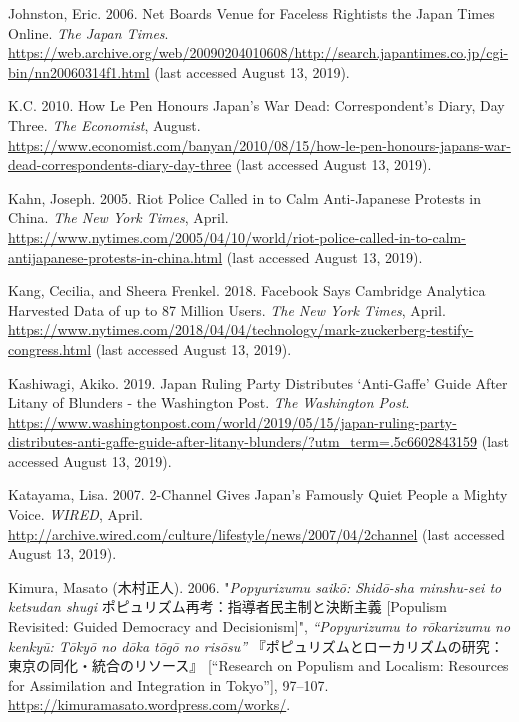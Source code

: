\documentclass[10pt,british,A4paper,oneside]{memoir}
\begin{document}
\hypertarget{ref-johnston_net_2006}{}
Johnston, Eric. 2006. Net Boards Venue for Faceless Rightists the Japan
Times Online. \emph{The Japan Times}.
\url{https://web.archive.org/web/20090204010608/http://search.japantimes.co.jp/cgi-bin/nn20060314f1.html} (last accessed August 13, 2019).

\hypertarget{ref-k.c._how_2010}{}
K.C. 2010. How Le Pen Honours Japan's War Dead: Correspondent's Diary,
Day Three. \emph{The Economist}, August.
\url{https://www.economist.com/banyan/2010/08/15/how-le-pen-honours-japans-war-dead-correspondents-diary-day-three} (last accessed August 13, 2019).

\hypertarget{ref-kahn_riot_2005}{}
Kahn, Joseph. 2005. Riot Police Called in to Calm Anti-Japanese Protests
in China. \emph{The New York Times}, April.
\url{https://www.nytimes.com/2005/04/10/world/riot-police-called-in-to-calm-antijapanese-protests-in-china.html} (last accessed August 13, 2019).

\hypertarget{ref-kang_facebook_2018}{}
Kang, Cecilia, and Sheera Frenkel. 2018. Facebook Says Cambridge
Analytica Harvested Data of up to 87 Million Users. \emph{The New York
Times}, April.
\url{https://www.nytimes.com/2018/04/04/technology/mark-zuckerberg-testify-congress.html} (last accessed August 13, 2019).

\hypertarget{ref-kashiwagi_japan_2019}{}
Kashiwagi, Akiko. 2019. Japan Ruling Party Distributes `Anti-Gaffe'
Guide After Litany of Blunders - the Washington Post. \emph{The
Washington Post}.
\url{https://www.washingtonpost.com/world/2019/05/15/japan-ruling-party-distributes-anti-gaffe-guide-after-litany-blunders/?utm_term=.5c6602843159} (last accessed August 13, 2019).

\hypertarget{ref-katayama_2-channel_2007}{}
Katayama, Lisa. 2007. 2-Channel Gives Japan's Famously Quiet People a
Mighty Voice. \emph{WIRED}, April.
\url{http://archive.wired.com/culture/lifestyle/news/2007/04/2channel} (last accessed August 13, 2019).

\hypertarget{ref-kimura__2006}{}
Kimura, Masato (木村正人). 2006. "\emph{Popyurizumu saikō: Shidō-sha minshu-sei to ketsudan shugi} ポピュリズム再考：指導者民主制と決断主義 [Populism Revisited: Guided Democracy and Decisionism]",
\emph{“Popyurizumu to rōkarizumu no kenkyū: Tōkyō no dōka tōgō no risōsu”} 『ポピュリズムとローカリズムの研究：東京の同化・統合のリソース』 [“Research on Populism and Localism: Resources for Assimilation and Integration in Tokyo”], 97--107. \url{https://kimuramasato.wordpress.com/works/}.
\end{document}
